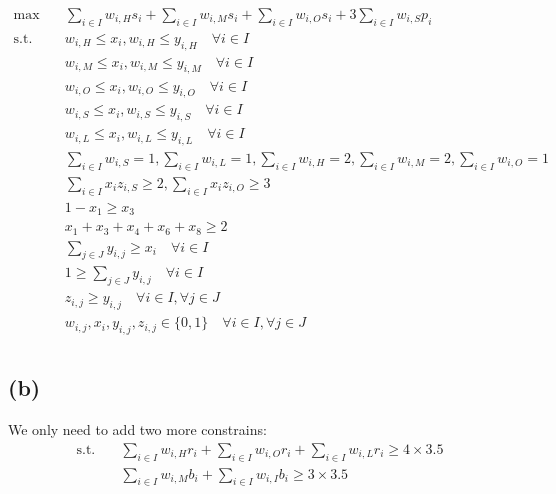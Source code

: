 \documentclass[12pt, a4paper]{article}
\begin{document}
\begin{equation}\label{eq:LP}\begin{split}
	\max \quad & \sum_{i \in I} w_{i, H} s_i + \sum_{i \in I} w_{i, M} s_i + \sum_{i \in I} w_{i, O} s_i + 3 \sum_{i \in I} w_{i, S} p_i\\
	\mbox{s.t.} \quad 
	& w_{i, H} \leq x_i, w_{i, H} \leq y_{i, H} \quad \forall i \in I\\
	& w_{i, M} \leq x_i, w_{i, M} \leq y_{i, M} \quad \forall i \in I\\
	& w_{i, O} \leq x_i, w_{i, O} \leq y_{i, O} \quad \forall i \in I\\
	& w_{i, S} \leq x_i, w_{i, S} \leq y_{i, S} \quad \forall i \in I\\
	& w_{i, L} \leq x_i, w_{i, L} \leq y_{i, L} \quad \forall i \in I\\
	& \sum_{i \in I} w_{i, S} = 1, \sum_{i \in I} w_{i, L} = 1, \sum_{i \in I} w_{i, H} = 2, \sum_{i \in I} w_{i, M} = 2, \sum_{i \in I} w_{i, O} = 1 \\
	& \sum_{i \in I} x_i z_{i,S} \geq 2, \sum_{i \in I} x_i z_{i,O} \geq 3\\
	& 1 - x_1 \geq x_3\\
	& x_1 + x_3 + x_4 + x_6 + x_8 \geq 2\\
	& \sum_{j \in J} y_{i,j} \geq x_i \quad \forall i \in I\\
	& 1 \geq \sum_{j \in J} y_{i,j} \quad \forall i \in I\\
	& z_{i,j} \geq y_{i, j} \quad \forall i \in I ,\forall j \in J\\
	& w_{i, j}, x_i, y_{i, j}, z_{i, j} \in \{0, 1\} \quad \forall i \in I ,\forall j \in J\\
\end{split}\end{equation}

\subsection{(b)}
We only need to add two more constrains:
\begin{equation}\label{eq:LP}\begin{split}
	\mbox{s.t.} \quad 
	& \sum_{i \in I} w_{i, H} r_i + \sum_{i \in I} w_{i, O} r_i + \sum_{i \in I} w_{i, L} r_i \geq 4 \times 3.5 \\
	& \sum_{i \in I} w_{i, M} b_i + \sum_{i \in I} w_{i, I} b_i \geq 3 \times 3.5 \\
\end{split}\end{equation}
\end{document}
